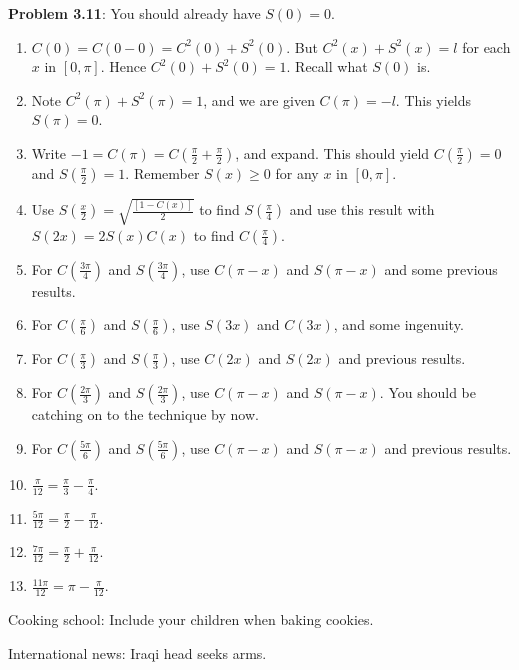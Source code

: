 \documentclass[english]{book}
\begin{document}
\textbf{Problem 3.11}: You should already have $S(0) = 0$.
\begin{enumerate}[\hspace{1cm}1)]
  \item $C(0) = C(0 - 0) = C^{2}(0) + S^{2}(0)$. But $C^{2}(x) + S^{2}(x) = l$ for each $x$ in $[0,\pi]$. Hence $C^{2}(0) + S^{2}(0) = 1$. Recall what $S(0)$ is.
  \item Note $C^{2}(\pi) + S^{2}(\pi) = 1$, and we are given $C(\pi) = -l$. This yields $S(\pi) = 0$.
  \item Write $-1= C(\pi) = C(\frac{\pi}{2} + \frac{\pi}{2})$, and expand. This should yield $C(\frac{\pi}{2}) = 0$ and $S(\frac{\pi}{2}) = 1$. Remember $S(x) \geq 0$ for any $x$ in $[0, \pi]$.
  \item Use $S(\frac{x}{2}) = \sqrt{\frac{[1 - C(x)]}{2}}$ to find $S(\frac{\pi}{4})$ and use this result with $S(2x) = 2S(x)C(x)$ to find $C(\frac{\pi}{4})$.
  \item For $C(\frac{3\pi}{4})$ and $S(\frac{3\pi}{4})$, use $C(\pi-x)$ and $S(\pi-x)$ and some previous results.
  \item For $C(\frac{\pi}{6})$ and $S(\frac{\pi}{6})$, use $S(3x)$ and $C(3x)$, and some ingenuity.
  \item For $C(\frac{\pi}{3})$ and $S(\frac{\pi}{3})$, use $C(2x)$ and $S(2x)$ and previous results.
  \item For $C(\frac{2\pi}{3})$ and $S(\frac{2\pi}{3})$, use $C(\pi-x)$ and $S(\pi-x)$. You should be catching on to the technique by now.
  \item For $C(\frac{5\pi}{6})$ and $S(\frac{5\pi}{6})$, use $C(\pi-x)$ and $S(\pi-x)$ and previous results.
  \item $\frac{\pi}{12} = \frac{\pi}{3} - \frac{\pi}{4}$.
  \item $\frac{5\pi}{12} = \frac{\pi}{2} - \frac{\pi}{12}$.
  \item $\frac{7\pi}{12} = \frac{\pi}{2} + \frac{\pi}{12}$.
  \item $\frac{11\pi}{12} = \pi - \frac{\pi}{12}$.
\end{enumerate}


\vspace{2cm}

\begin{center}
Cooking school: Include your children when baking cookies.
\vspace{0.5cm}

International news: Iraqi head seeks arms.
\end{center}
\end{document}
